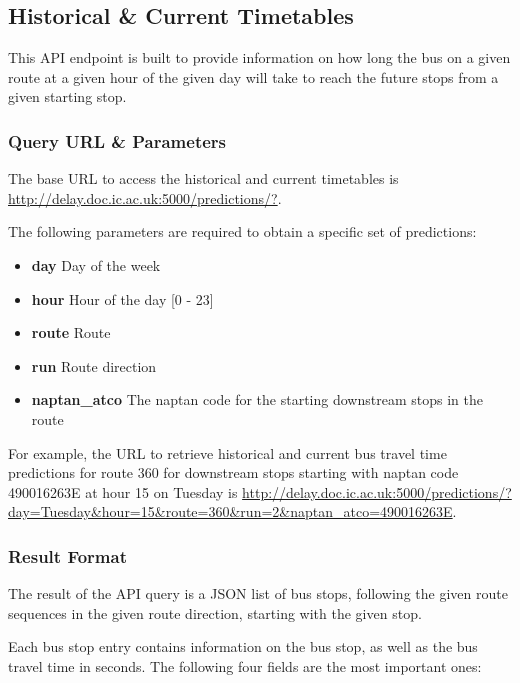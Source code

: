 \subsection{Historical \& Current Timetables}
\par This API endpoint is built to provide information on how long the bus on a given route at a given hour of the given day will take to reach the future stops from a given starting stop.

\subsubsection{Query URL \& Parameters}
\par The base URL to access the historical and current timetables is \url{http://delay.doc.ic.ac.uk:5000/predictions/?}.

\par The following parameters are required to obtain a specific set of predictions:
\begin{itemize}
  \item \textbf{day} Day of the week
  \item \textbf{hour} Hour of the day [0 - 23]
  \item \textbf{route} Route
  \item \textbf{run} Route direction
  \item \textbf{naptan\_atco} The \gls{naptan} code for the starting downstream stops in the route
\end{itemize}

\par For example, the URL to retrieve historical and current bus travel time predictions for route 360 for downstream stops starting with \gls{naptan} code 490016263E at hour 15 on Tuesday is \url{http://delay.doc.ic.ac.uk:5000/predictions/?day=Tuesday&hour=15&route=360&run=2&naptan_atco=490016263E}.

\subsubsection{Result Format}
\par The result of the API query is a JSON list of bus stops, following the given route sequences in the given route direction, starting with the given stop.

\par Each bus stop entry contains information on the bus stop, as well as the bus travel time in seconds. The following four fields are the most important ones:

